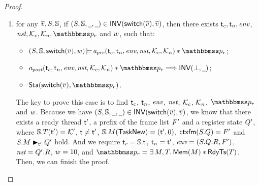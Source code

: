 \begin{proof}
\begin{enumerate}
        \item for any $\overline{v}, S, \mathbb{S}$, 
        if $(S, \mathbb{S}, \underline{\ \,}, \underline{\ \,}) \in 
            \textsf{INV}{(\mathsf{switch}(\overline{v}), \overline{v})}$, 
        then there exists $\textsf{t}_c, \textsf{t}_n, \textit{env}$, $\nst, 
        \hthrdlocalst_c, \hthrdlocalst_n, \relastP_r$ and $w$, 
        such that:
        \begin{itemize}
            \item $\asrtmodel{(\state, \hpstate, \primsw(\args{\val}), \word)}
                {\Apre(\thrdid_c, \thrdid_n, \env, \nst, \hthrdlocalst_c, 
                \hthrdlocalst_n) \sepstar \relastP_r}$; 
            \item  $\Apost(\thrdid_c, \thrdid_n, \env, \nst, \hthrdlocalst_c, 
                \hthrdlocalst_n) \sepstar \relastP_r \Longrightarrow 
                \INV{(\primdone, \notCare)}$; 
            \item $\Sta(\primsw(\args{\val}), \relastP_r)$. 
        \end{itemize}
        \vspace*{0.3em}
        The key to prove this case is to find $\textsf{t}_c$, $\textsf{t}_n$, $\textit{env}$, 
        $\textit{nst}$, $\mathcal{K}_c$, $\mathcal{K}_n$, $\relastP_r$ and $w$. 
        Because we have $(S, \mathbb{S}, \underline{\ \,}, \underline{\ \,}) \in 
            \textsf{INV}{(\mathsf{switch}(\overline{v}), \overline{v})}$, we know that there exists 
        a ready thread $\textsf{t}'$, a prefix of the frame list $F'$ 
        and a register state $Q'$, where 
        $\mathbb{S}.T(\textsf{t}') = \mathcal{K}'$, 
        $\textsf{t} \neq \textsf{t}'$, $\mathbb{S}.M(\mathsf{TaskNew}) = (\textsf{t}', 0)$, 
        $\textsf{ctxfm}(S.Q) = F'$ 
        and ${S.M} \blacktriangleright_{\textsf{t}'} {Q'}$ hold. 
        And we require $\textsf{t}_c = \mathbb{S}.\textsf{t}$, $\textsf{t}_n = \textsf{t}'$, 
        $\textit{env} = (S.Q.R, F')$, $\textit{nst} = Q'.R$, $w = 10$, 
        and $\relastP_r = \exists \, \Mem, \thrdpool. \, \MemRAsrt{\Mem}
        \sepstar \RdyTsRAsrt{\thrdpool}$. Then, we can finish 
        the proof. 


\end{enumerate}
\end{proof}
